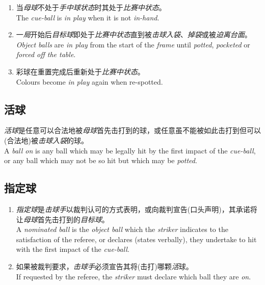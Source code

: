 \begin{enumerate}[label=(\alph*)]
    \item 当\emph{母球}不处于\emph{手中球状态}时其处于\emph{比赛中状态}。\\
    The \emph{cue-ball} is \emph{in play} when it is not \emph{in-hand}.
    \item 一\emph{局}开始后\emph{目标球}即处于\emph{比赛中状态}直到被\emph{击球入袋}、\emph{掉袋}或被\emph{迫离台面}。\\
    \emph{Object balls} are \emph{in play} from the start of the \emph{frame} until \emph{potted}, \emph{pocketed} or \emph{forced off the table}.
    \item 彩球在重置完成后重新处于\emph{比赛中状态}。\\
    Colours become \emph{in play} again when re-spotted.
\end{enumerate}

\subsection{活球}

\noindent \emph{活球}是任意可以合法地被\emph{母球}首先击打到的球，或任意虽不能被如此击打到但可以(合法地)被\emph{击球入袋}的球。\\
A \emph{ball on} is any ball which may be legally hit by the first impact of the \emph{cue-ball}, or any ball which may not be so hit but which may be \emph{potted}.

\subsection{指定球}

\begin{enumerate}[label=(\alph*)]
    \item \emph{指定球}是\emph{击球手}以裁判认可的方式表明，或向裁判宣告(口头声明)，其承诺将让\emph{母球}首先击打到的\emph{目标球}。\\
    A \emph{nominated ball} is the \emph{object ball} which the \emph{striker} indicates to the satisfaction of the referee, or declares (states verbally), they undertake to hit with the first impact of the \emph{cue-ball}.
    \item 如果被裁判要求，\emph{击球手}必须宣告其将(击打)哪颗\emph{活}球。\\
    If requested by the referee, the \emph{striker} must declare which ball they are \emph{on}. 
\end{enumerate}

